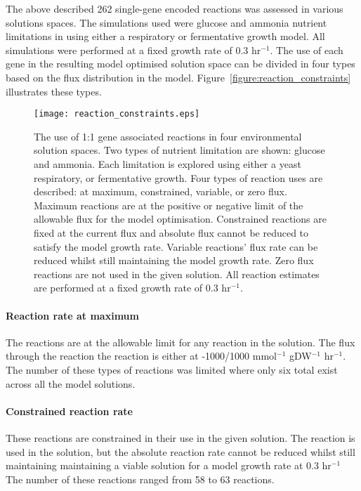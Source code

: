 The above described 262 single-gene encoded reactions was assessed in various solutions spaces. The simulations used were glucose and ammonia nutrient limitations in using either a respiratory or fermentative growth model. All simulations were performed at a fixed growth rate of 0.3 hr$^{-1}$. The use of each gene in the resulting model optimised solution space can be divided in four types based on the flux distribution in the model. Figure~\vref{figure:reaction_constraints} illustrates these types.

\begin{figure}
\centering
\texttt{[image: reaction\_constraints.eps]}
\caption[Gene use in model optimised solution space]{The use of 1:1 gene associated reactions in four environmental solution spaces. Two types of nutrient limitation are shown: glucose and ammonia. Each limitation is explored using either a yeast respiratory, or fermentative growth. Four types of reaction uses are described: at maximum, constrained, variable, or zero flux. Maximum reactions are at the positive or negative limit of the allowable flux for the model optimisation. Constrained reactions are fixed at the current flux and absolute flux cannot be reduced to satisfy the model growth rate. Variable reactions' flux rate can be reduced whilst still maintaining the model growth rate. Zero flux reactions are not used in the given solution. All reaction estimates are performed at a fixed growth rate of 0.3 hr$^{-1}$. }
\label{figure:reaction_constraints}
\end{figure}

\paragraph{Reaction rate at maximum}

The reactions are at the allowable limit for any reaction in the solution. The flux through the reaction the reaction is either at -1000/1000 mmol$^{-1}$ gDW$^{-1}$ hr$^{-1}$. The number of these types of reactions was limited where only six total exist across all the model solutions.

\paragraph{Constrained reaction rate}

These reactions are constrained in their use in the given solution. The reaction is used in the solution, but the absolute reaction rate cannot be reduced whilst still maintaining maintaining a viable solution for a model growth rate at 0.3 hr$^{-1}$ The number of these reactions ranged from 58 to 63 reactions.

